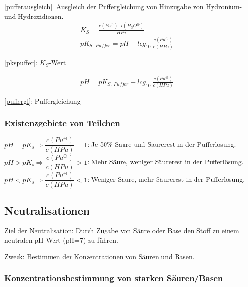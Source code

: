 \ref{pufferausgleich}: Ausgleich der Puffergleichung von Hinzugabe von Hydronium- und Hydroxidionen.\\

{\large
	\begin{equation}
	\begin{split}
		\label{pkspuffer}
		K_S = \frac{c(Pu^\ominus) \cdot c(H_3O^\oplus)}{HPu}\\
		pK_{S,\ Puffer} = pH - log_{10}\ \frac{c(Pu^\ominus)}{c(HPu)}
	\end{split}
	\end{equation}
}

\ref{pkspuffer}: $K_S$-Wert

{\large
	\begin{equation}
	\begin{split}
	\label{puffergl}
	pH= pK_{S,\ Puffer} + log_{10}\ \frac{c(Pu^\ominus)}{c(HPu)}
	\end{split}
	\end{equation}
}

\ref{puffergl}: Puffergleichung

\subsubsection{Existenzgebiete von Teilchen}

$pH = pK_s \Rightarrow \dfrac{c(Pu^\ominus)}{c(HPu)} = 1$: Je 50\% Säure und Säurerest in der Pufferlösung.\\

$pH > pK_s \Rightarrow \dfrac{c(Pu^\ominus)}{c(HPu)} > 1$: Mehr Säure, weniger Säurerest in der Pufferlösung.\\

$pH < pK_s \Rightarrow \dfrac{c(Pu^\ominus)}{c(HPu)} < 1$: Weniger Säure, mehr Säurerest in der Pufferlösung.

\subsection{Neutralisationen}

Ziel der Neutralisation: Durch Zugabe von Säure oder Base den Stoff zu einem neutralen pH-Wert (pH=7) zu führen.

Zweck: Bestimmen der Konzentrationen von Säuren und Basen.

\subsubsection{Konzentrationsbestimmung von starken Säuren/Basen}

